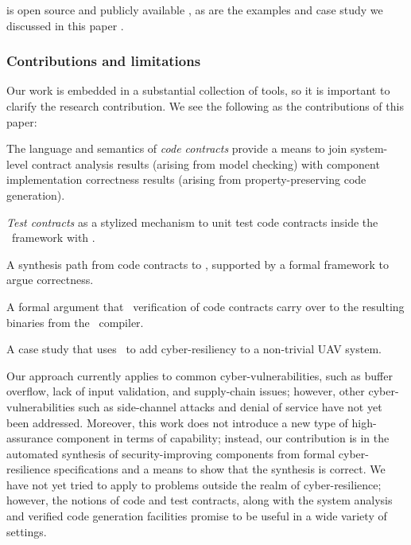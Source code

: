 {\brfcs} is open source and publicly available \cite{fmide}, as are the
examples and case study we discussed in this paper \cite{repo,
phase2, camkes, case}.

\subsubsection*{Contributions and limitations}

Our work is embedded in a substantial collection of tools, so it is
important to clarify the research contribution. We see the following
as the contributions of this paper:

\begin{compactitem}
  \item The language and semantics of \emph{code contracts} provide a means
  to join system-level contract analysis results (arising from model
  checking) with component implementation correctness results (arising
  from property-preserving code generation).

\item \emph{Test contracts} as a
  stylized mechanism to unit test code contracts inside the \brfcs\
  framework with \agr.

\item A synthesis path from code contracts to \ckml, supported by a formal
   framework to argue correctness.

\item A formal argument that \agr\ verification of code contracts carry over
  to the resulting binaries from the \ckml\ compiler.

\item A case
  study that uses \brfcs\ to add cyber-resiliency to a non-trivial UAV
  system.
\end{compactitem}

Our approach currently applies to common cyber-vulnerabilities, such
as buffer overflow, lack of input validation, and supply-chain issues;
however, other cyber-vulnerabilities such as side-channel attacks and
denial of service have not yet been addressed. Moreover, this work
does not introduce a new type of high-assurance component in terms of
capability; instead, our contribution is in the automated synthesis of
security-improving components from formal cyber-resilience
specifications and a means to show that the synthesis is correct. We
have not yet tried to apply {\brfcs} to problems outside the realm of
cyber-resilience; however, the notions of code and test contracts,
along with the system analysis and verified code generation facilities
promise to be useful in a wide variety of settings.

